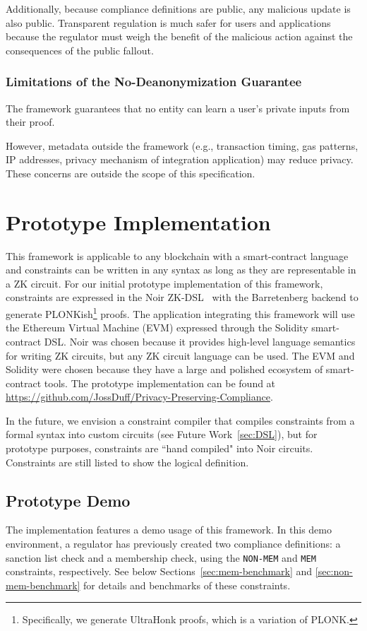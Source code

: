 \documentclass[9pt]{extreport}
\begin{document}
Additionally, because compliance definitions are public, any malicious update is also public.  Transparent regulation is much safer for users and applications because the regulator must weigh the benefit of the malicious action against the consequences of the public fallout.

\subsection{Limitations of the No-Deanonymization Guarantee}
\label{sec:no-deanon}

The framework guarantees that no entity can learn a user's private inputs from their proof.

However, metadata outside the framework (e.g., transaction timing, gas patterns, IP addresses, privacy mechanism of integration application) may reduce privacy. These concerns are outside the scope of this specification.

\chapter{Prototype Implementation}
This framework is applicable to any blockchain with a smart-contract language and constraints can be written in any syntax as long as they are representable in a ZK circuit.  For our initial prototype implementation of this framework, constraints are expressed in the Noir ZK-DSL~\cite{AztecNoir22} with the Barretenberg backend to generate PLONKish\footnote{Specifically, we generate UltraHonk proofs, which is a variation of PLONK.} proofs.  The application integrating this framework will use the Ethereum Virtual Machine (EVM) expressed through the Solidity smart-contract DSL.  Noir was chosen because it provides high-level language semantics for writing ZK circuits, but any ZK circuit language can be used.  The EVM and Solidity were chosen because they have a large and polished ecosystem of smart-contract tools.  The prototype implementation can be found at \url{https://github.com/JossDuff/Privacy-Preserving-Compliance}.

In the future, we envision a constraint compiler that compiles constraints from a formal syntax into custom circuits (see Future Work~\ref{sec:DSL}), but for prototype purposes, constraints are ``hand compiled" into Noir circuits.  Constraints are still listed to show the logical definition.

\section{Prototype Demo}
The implementation features a demo usage of this framework.  In this demo environment, a regulator has previously created two compliance definitions: a sanction list check and a membership check, using the \texttt{NON-MEM} and \texttt{MEM} constraints, respectively.  See below Sections~\ref{sec:mem-benchmark} and \ref{sec:non-mem-benchmark} for details and benchmarks of these constraints.
\end{document}
